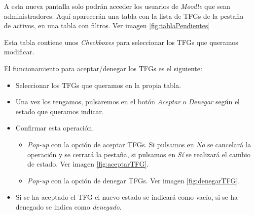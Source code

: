 A esta nueva pantalla solo podrán acceder los usuarios de \emph{Moodle} que sean administradores.
Aquí aparecerán una tabla con la lista de TFGs de la pestaña de activos, en una tabla con filtros. Ver imagen \ref{fig:tablaPendientes}


Esta tabla contiene unos \emph{Checkboxes} para seleccionar los TFGs que queramos modificar.

El funcionamiento para aceptar/denegar los TFGs es el siguiente:
\begin{itemize}
	\item Seleccionar los TFGs que queramos en la propia tabla.
	\item Una vez los tengamos, pulsaremos en el botón \emph{Aceptar} o \emph{Denegar} según el estado que queramos indicar.
	\item Confirmar esta operación. 
	\begin{itemize}
		\item \emph{Pop-up} con la opción de aceptar TFGs. Si pulsamos en \emph{No} se cancelará la operación y se cerrará la pestaña, si pulsamos en \emph{Sí} se realizará el cambio de estado. Ver imagen \ref{fig:aceptarTFG}.
		\item \emph{Pop-up} con la opción de denegar TFGs. Ver imagen \ref{fig:denegarTFG}.
	\end{itemize}
	\item Si se ha aceptado el TFG el nuevo estado se indicará como vacío, si se ha denegado se indica como \emph{denegado}.
\end{itemize}


